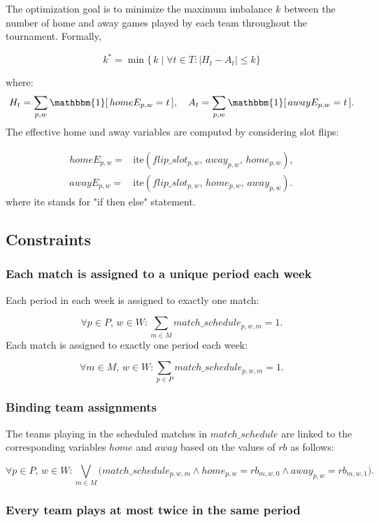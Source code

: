 The optimization goal is to minimize the maximum imbalance $k$ between the number of home and away games played by each team throughout the tournament. Formally,

\[
k^* = \min \big\{\, k \mid \forall t \in T : |H_t - A_t| \leq k \big\}
\]

where:
\[
H_t = \sum_{p,w} \mathbbm{1}[\,homeE_{p,w} = t\,], 
\quad
A_t = \sum_{p,w} \mathbbm{1}[\,awayE_{p,w} = t\,].
\]
The effective home and away variables are computed by considering slot flips:

\begin{align*}
homeE_{p,w} =& \text{ite}(flip\_slot_{p,w},\, away_{p,w},\, home_{p,w}), \\
awayE_{p,w} =& \text{ite}(flip\_slot_{p,w},\, home_{p,w},\, away_{p,w}).
\end{align*}
where ite stands for "if then else" statement.

\subsection{Constraints}

\subsubsection{Each match is assigned to a unique period each week}

Each period in each week is assigned to exactly one match:

\[
\forall p \in P,\, w \in W: 
\sum_{m \in M} match\_schedule_{p,w,m} = 1.
\]
Each match is assigned to exactly one period each week:

\[
\forall m \in M,\, w \in W: 
\sum_{p \in P} match\_schedule_{p,w,m} = 1.
\]

\subsubsection{Binding team assignments}
The teams playing in the scheduled matches in $match\_schedule$ are linked to the corresponding variables $home$ and $away$ based on the values of $rb$ as follows:

\[
\forall p \in P,\, w \in W: 
\bigvee_{m \in M} \big(
match\_schedule_{p,w,m} \wedge home_{p,w} = rb_{m,w,0} \wedge away_{p,w} = rb_{m,w,1}
\big).
\]

\subsubsection{Every team plays at most twice in the same period}

